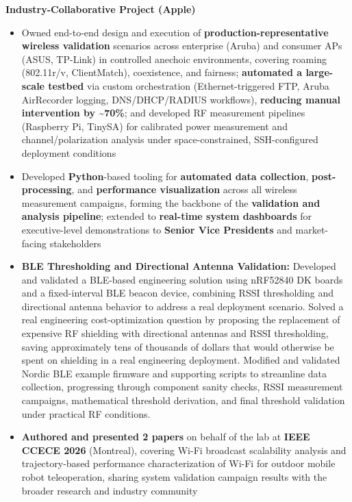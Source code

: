 \documentclass[letterpaper,11pt]{article}
\newcommand{\resumeItem}[1]{
  \item\small{
    {#1 \vspace{-2pt}}
  }
}
\begin{document}
\item \textbf{Industry-Collaborative Project (Apple)}
\begin{itemize}[leftmargin=1.5em]


\item Owned end-to-end design and execution of \textbf{production-representative wireless validation} scenarios across enterprise (Aruba) and consumer APs (ASUS, TP-Link) in controlled anechoic environments, covering roaming (802.11r/v, ClientMatch), coexistence, and fairness; \textbf{automated a large-scale testbed} via custom orchestration (Ethernet-triggered FTP, Aruba AirRecorder logging, DNS/DHCP/RADIUS workflows), \textbf{reducing manual intervention by \textasciitilde70\%}; and developed RF measurement pipelines (Raspberry Pi, TinySA) for calibrated power measurement and channel/polarization analysis under space-constrained, SSH-configured deployment conditions



        \item Developed \textbf{Python}-based tooling for \textbf{automated data collection}, \textbf{post-processing}, and \textbf{performance visualization} across all wireless measurement campaigns, forming the backbone of the \textbf{validation and analysis pipeline}; extended to \textbf{real-time system dashboards} for executive-level demonstrations to \textbf{Senior Vice Presidents} and market-facing stakeholders




  \item \textbf{BLE Thresholding and Directional Antenna Validation:} Developed and validated a BLE-based engineering solution using nRF52840 DK boards and a fixed-interval BLE beacon device, combining RSSI thresholding and directional antenna behavior to address a real deployment scenario. Solved a real engineering cost-optimization question by proposing the replacement of expensive RF shielding with directional antennas and RSSI thresholding, saving approximately tens of thousands of dollars that would otherwise be spent on shielding in a real engineering deployment. Modified and validated Nordic BLE example firmware and supporting scripts to streamline data collection, progressing through component sanity checks, RSSI measurement campaigns, mathematical threshold derivation, and final threshold validation under practical RF conditions.

  \resumeItem{\textbf{Authored and presented 2 papers} on behalf of the lab at \textbf{IEEE CCECE 2026} (Montreal), covering Wi-Fi broadcast scalability analysis and trajectory-based performance characterization of Wi-Fi for outdoor mobile robot teleoperation, sharing system validation campaign results with the broader research and industry community}


  
\end{itemize}
\end{document}
